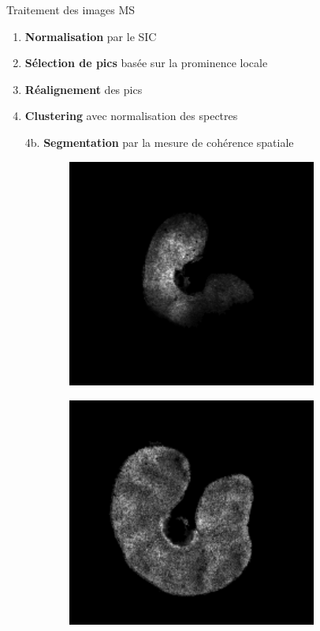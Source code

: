 \documentclass[10pt]{beamer}
\begin{document}
\begin{frame}{Traitement des images MS}
  \begin{enumerate}
  \item \textbf{Normalisation} par le SIC
  \item \textbf{Sélection de pics} basée sur la prominence locale
  \item \textbf{Réalignement} des pics
  \item \textbf{Clustering} avec normalisation des spectres \cite{Alexandrov11}
  \item[4b.] \textbf{Segmentation} par la mesure de cohérence spatiale
  \end{enumerate}

        \begin{figure}[ht]
    \centering
    \begin{subfigure}[t]{0.33\textwidth}
      \centering
      \includegraphics[width=0.9\textwidth]{fig/maldi_250_density_s6}
      \caption{}
      \label{subfig:maldi_250_density_s6}
    \end{subfigure}%
    \begin{subfigure}[t]{0.33\textwidth}
      \centering
      \includegraphics[width=0.9\textwidth]{fig/maldi_500_density_s5}

\end{subfigure}
\end{figure}
\end{frame}
\end{document}
